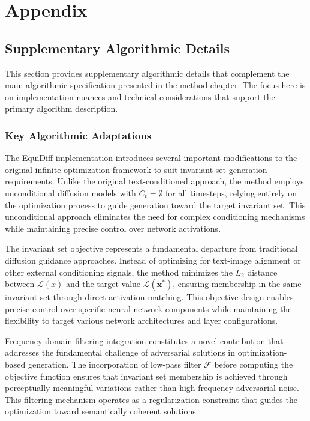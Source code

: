 \appendix

\chapter{Appendix}\label{r:appendix}


\section{Supplementary Algorithmic Details}\label{appendix:infinite_optimization}
This section provides supplementary algorithmic details that complement the main algorithmic specification presented in the method chapter. The focus here is on implementation nuances and technical considerations that support the primary algorithm description.

\subsection{Key Algorithmic Adaptations}

The EquiDiff implementation introduces several important modifications to the original infinite optimization framework to suit invariant set generation requirements. Unlike the original text-conditioned approach, the method employs unconditional diffusion models with $C_t = \emptyset$ for all timesteps, relying entirely on the optimization process to guide generation toward the target invariant set. This unconditional approach eliminates the need for complex conditioning mechanisms while maintaining precise control over network activations.

The invariant set objective represents a fundamental departure from traditional diffusion guidance approaches. Instead of optimizing for text-image alignment or other external conditioning signals, the method minimizes the $L_2$ distance between $\mathcal{L}(x)$ and the target value $\mathcal{L}(\mathbf{x^*})$, ensuring membership in the same invariant set through direct activation matching. This objective design enables precise control over specific neural network components while maintaining the flexibility to target various network architectures and layer configurations.

Frequency domain filtering integration constitutes a novel contribution that addresses the fundamental challenge of adversarial solutions in optimization-based generation. The incorporation of low-pass filter $\mathcal{F}$ before computing the objective function ensures that invariant set membership is achieved through perceptually meaningful variations rather than high-frequency adversarial noise. This filtering mechanism operates as a regularization constraint that guides the optimization toward semantically coherent solutions.

